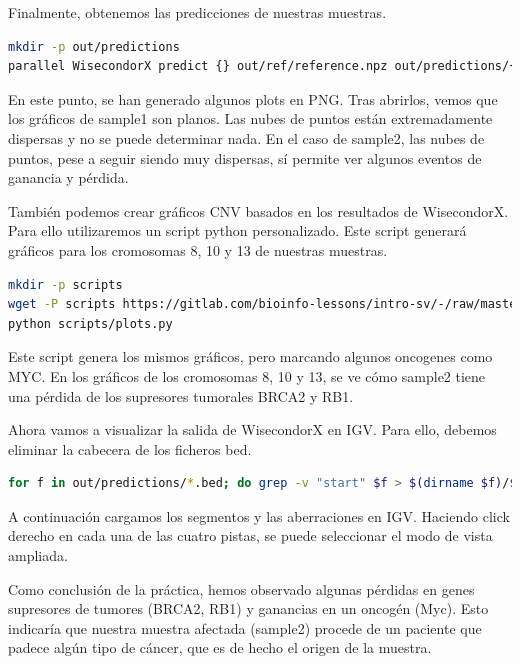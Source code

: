 Finalmente, obtenemos las predicciones de nuestras muestras.
\begin{lstlisting}[language=bash]
mkdir -p out/predictions
parallel WisecondorX predict {} out/ref/reference.npz out/predictions/{/.} --bed --plot ::: out/npz/sample*.npz
\end{lstlisting}

En este punto, se han generado algunos plots en PNG. Tras abrirlos, vemos que los gráficos de sample1 son planos. Las nubes de puntos están extremadamente dispersas y no se puede determinar nada. En el caso de sample2, las nubes de puntos, pese a seguir siendo muy dispersas, sí permite ver algunos eventos de ganancia y pérdida. 

También podemos crear gráficos CNV basados en los resultados de WisecondorX. Para ello utilizaremos un script python personalizado.
Este script generará gráficos para los cromosomas 8, 10 y 13 de nuestras muestras.
\begin{lstlisting}[language=bash]
mkdir -p scripts
wget -P scripts https://gitlab.com/bioinfo-lessons/intro-sv/-/raw/master/scripts/plots.py
python scripts/plots.py
\end{lstlisting}

Este script genera los mismos gráficos, pero marcando algunos oncogenes como MYC. En los gráficos de los cromosomas 8, 10 y 13, se ve cómo sample2 tiene una pérdida de los supresores tumorales BRCA2 y RB1.

Ahora vamos a visualizar la salida de WisecondorX en IGV. Para ello, debemos eliminar la cabecera de los ficheros bed.
\begin{lstlisting}[language=bash]
for f in out/predictions/*.bed; do grep -v "start" $f > $(dirname $f)/$(basename $f .bed).igv.bed; done;
\end{lstlisting}
A continuación cargamos los segmentos y las aberraciones en IGV. Haciendo click derecho en cada una de las cuatro pistas, se puede seleccionar el modo de vista ampliada. 

Como conclusión de la práctica, hemos observado algunas pérdidas en genes supresores de tumores (BRCA2, RB1) y ganancias en un oncogén (Myc).
Esto indicaría que nuestra muestra afectada (sample2) procede de un paciente que padece algún tipo de cáncer, que es de hecho el origen de la muestra.
